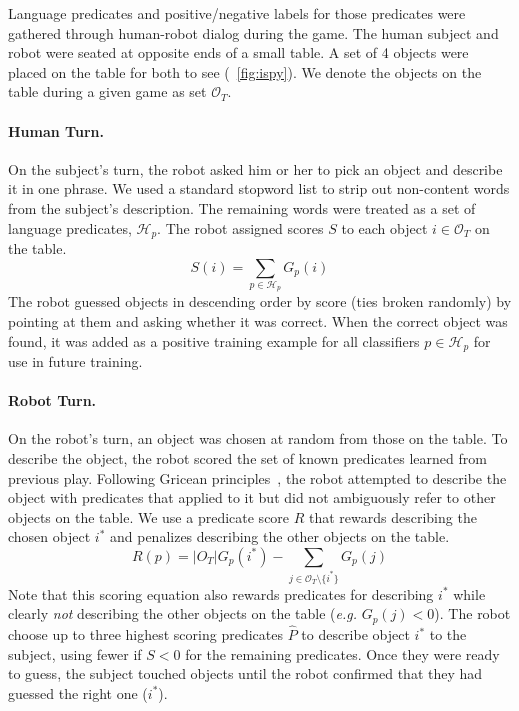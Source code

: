 Language predicates and positive/negative labels for those predicates were gathered through human-robot dialog during the \ispy game.
The human subject and robot were seated at opposite ends of a small table.
A set of 4 objects were placed on the table for both to see (~\ref{fig:ispy}).
We denote the objects on the table during a given game as set $\mathcal{O}_T$.

\paragraph{Human Turn.} On the subject's turn, the robot asked him or her to pick an object and describe it in one phrase.
We used a standard stopword list to strip out non-content words from the subject's description.
The remaining words were treated as a set of language predicates, $\mathcal{H}_p$.
The robot assigned scores $S$ to each object $i\in \mathcal{O}_T$ on the table.
\begin{equation}
	S(i) = \sum_{p\in \mathcal{H}_p}{G_p(i)}
\end{equation}
The robot guessed objects in descending order by score (ties broken randomly) by pointing at them and asking whether it was correct.
When the correct object was found, it was added as a positive training example for all classifiers  $p\in \mathcal{H}_p$ for use in future training.

\paragraph{Robot Turn.} On the robot's turn, an object was chosen at random from those on the table.
To describe the object, the robot scored the set of known predicates learned from previous play.
Following Gricean principles~\cite{grice:bkchapter75}, the robot attempted to describe the object with predicates that applied to it but did not ambiguously refer to other objects on the table.
We use a predicate score $R$ that rewards describing the chosen object $i^*$ and penalizes describing the other objects on the table.
\begin{equation}
	R(p) = |O_T|G_p(i^*) - \sum_{j\in{\mathcal{O}_T}\setminus\{i^*\}}{G_p(j)}
\end{equation}
Note that this scoring equation also rewards predicates for describing $i^*$ while clearly {\it not} describing the other objects on the table (\textit{e.g.}  $G_p(j)<0$).
The robot choose up to three highest scoring predicates $\hat{P}$ to describe object $i^*$ to the subject, using fewer if $S<0$ for the remaining predicates.
Once they were ready to guess, the subject touched objects until the robot confirmed that they had guessed the right one ($i^*$).

